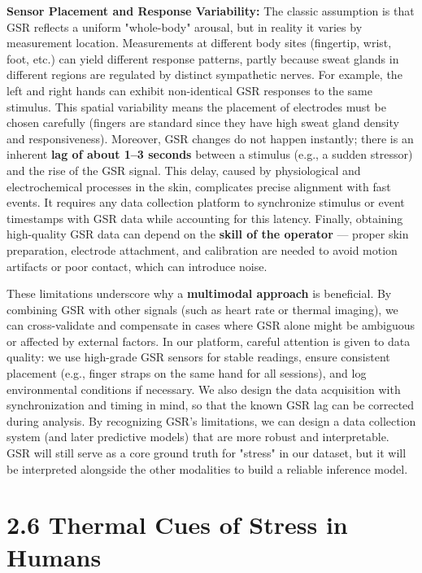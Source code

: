 \documentclass[11pt,a4paper]{report}
\begin{document}
\textbf{Sensor Placement and Response Variability:} The classic assumption is that GSR reflects a uniform "whole-body" arousal, but in reality it varies by measurement location. Measurements at different body sites (fingertip, wrist, foot, etc.) can yield different response patterns, partly because sweat glands in different regions are regulated by distinct sympathetic nerves\cite{ElectrodermalActivityWiki}. For example, the left and right hands can exhibit non-identical GSR responses to the same stimulus\cite{ElectrodermalActivityWiki}. This spatial variability means the placement of electrodes must be chosen carefully (fingers are standard since they have high sweat gland density and responsiveness). Moreover, GSR changes do not happen instantly; there is an inherent \textbf{lag of about 1–3 seconds} between a stimulus (e.g., a sudden stressor) and the rise of the GSR signal\cite{ElectrodermalActivityWiki}. This delay, caused by physiological and electrochemical processes in the skin, complicates precise alignment with fast events. It requires any data collection platform to synchronize stimulus or event timestamps with GSR data while accounting for this latency. Finally, obtaining high-quality GSR data can depend on the \textbf{skill of the operator}\cite{ElectrodermalActivityWiki} — proper skin preparation, electrode attachment, and calibration are needed to avoid motion artifacts or poor contact, which can introduce noise.

These limitations underscore why a \textbf{multimodal approach} is beneficial. By combining GSR with other signals (such as heart rate or thermal imaging), we can cross-validate and compensate in cases where GSR alone might be ambiguous or affected by external factors. In our platform, careful attention is given to data quality: we use high-grade GSR sensors for stable readings, ensure consistent placement (e.g., finger straps on the same hand for all sessions), and log environmental conditions if necessary. We also design the data acquisition with synchronization and timing in mind, so that the known GSR lag can be corrected during analysis. By recognizing GSR's limitations, we can design a data collection system (and later predictive models) that are more robust and interpretable. GSR will still serve as a core ground truth for "stress" in our dataset, but it will be interpreted alongside the other modalities to build a reliable inference model.

\section{2.6 Thermal Cues of Stress in Humans}
\end{document}

